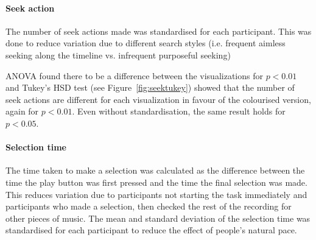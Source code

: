 \paragraph{Seek action}
The number of seek actions made was standardised for each participant. This was done to reduce variation due to
different search styles (i.e. frequent aimless seeking along the timeline vs. infrequent purposeful seeking)

ANOVA found there to be a difference between the visualizations for $p < 0.01$ and Tukey's HSD test (see
Figure~\ref{fig:seektukey}) showed that the number of seek actions are different for each visualization in favour of
the colourised version, again for $p < 0.01$. Even without standardisation, the same result holds for $p < 0.05$.


\paragraph{Selection time}
The time taken to make a selection was calculated as the difference between the time the play button was first pressed
and the time the final selection was made. This reduces variation due to participants not starting the task immediately
and participants who made a selection, then checked the rest of the recording for other pieces of music. The mean and
standard deviation of the selection time was standardised for each participant to reduce the effect of people's natural
pace.



